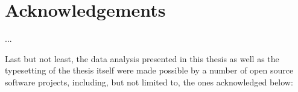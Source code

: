 \chapter*{Acknowledgements}

...

Last but not least, the data analysis presented in this thesis as well as the typesetting of the thesis itself were 
made possible by a number of open source software projects, including, but not limited to, the ones acknowledged below:

\begin{refsection}
	\nocite{*}
	\newrefcontext[sorting=none]
	\printbibliography[heading=none]
\end{refsection}